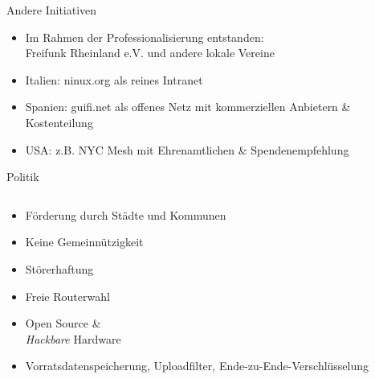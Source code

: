\documentclass[t,aspectratio=169]{beamer}
\begin{document}
\begin{frame}{Andere Initiativen}
    \begin{itemize}
      \item Im Rahmen der Professionalisierung entstanden:\\
            Freifunk Rheinland e.V. und andere lokale Vereine
      \item Italien: ninux.org als reines Intranet
      \item Spanien: guifi.net als offenes Netz mit kommerziellen Anbietern \& Kostenteilung
      \item USA: z.B. NYC Mesh mit Ehrenamtlichen \& Spendenempfehlung
    \end{itemize}
\end{frame}
  
  
\begin{frame}{Politik}
    \vspace{-2em}
    \begin{columns}
      \begin{column}{0.6\textwidth}
        \begin{itemize}
          \item Förderung durch Städte und Kommunen
          \item Keine Gemeinnützigkeit
          \item Störerhaftung
          \item Freie Routerwahl
          \item Open Source \&\\
          \textit{Hackbare} Hardware
          \item Vorratsdatenspeicherung, Uploadfilter, Ende-zu-Ende-Verschlüsselung
   \end{itemize}
      \end{column}
      \begin{column}{0.4\textwidth}
        \begin{center}

\end{center}
\end{column}
\end{columns}
\end{frame}
\end{document}

